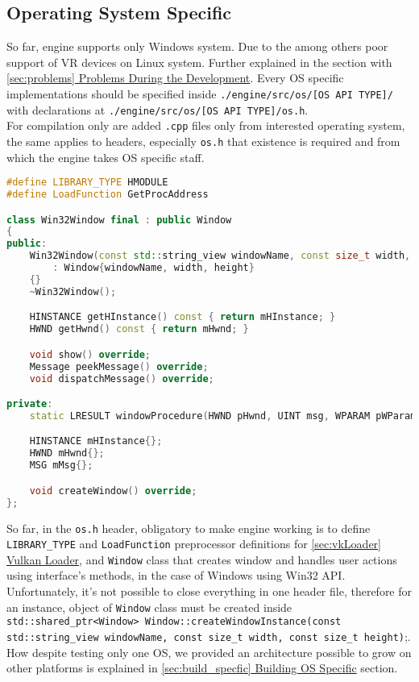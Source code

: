 \newpage
\subsection{Operating System Specific}
\label{sec:os}
So far, engine supports only Windows system. Due to the among others poor support of VR devices on Linux system.
Further explained in the section with \hyperref[sec:problems]{\ref*{sec:problems} Problems During the Development}.
Every OS specific implementations should be specified inside \texttt{./engine/src/os/[OS API TYPE]/} with declarations at \texttt{./engine/src/os/[OS API TYPE]/os.h}.\\
For compilation only are added \texttt{.cpp} files only from interested operating system, the same applies to headers, especially \texttt{os.h} that existence is required and from which the engine takes OS specific staff.
\begin{lstlisting}[language=c++, caption=Windows OS Header(./engine/src/os/win32/os.h)]
#define LIBRARY_TYPE HMODULE
#define LoadFunction GetProcAddress

class Win32Window final : public Window
{
public:
    Win32Window(const std::string_view windowName, const size_t width, const size_t height)
        : Window{windowName, width, height}
    {}
    ~Win32Window();

    HINSTANCE getHInstance() const { return mHInstance; }
    HWND getHwnd() const { return mHwnd; }

    void show() override;
    Message peekMessage() override;
    void dispatchMessage() override;

private:
    static LRESULT windowProcedure(HWND pHwnd, UINT msg, WPARAM pWParam, LPARAM wLParam);

    HINSTANCE mHInstance{};
    HWND mHwnd{};
    MSG mMsg{};

    void createWindow() override;
};
\end{lstlisting}

So far, in the \texttt{os.h} header, obligatory to make engine working is to define \texttt{LIBRARY\_TYPE} and \texttt{LoadFunction} preprocessor definitions for \hyperref[sec:vkLoader]{\ref*{sec:vkLoader} Vulkan Loader}, and \texttt{Window} class that creates window and handles user actions using interface's methods, in the case of Windows using Win32 API.\\
Unfortunately, it's not possible to close everything in one header file, therefore for an instance, object of \texttt{Window} class must be created inside \texttt{std::shared\_ptr<Window> Window::createWindowInstance(const std::string\_view windowName, const size\_t width, const size\_t height)};.
How despite testing only one OS, we provided an architecture possible to grow on other platforms is explained in
\hyperref[sec:build_specfic]{\ref*{sec:build_specfic} Building OS Specific} section.